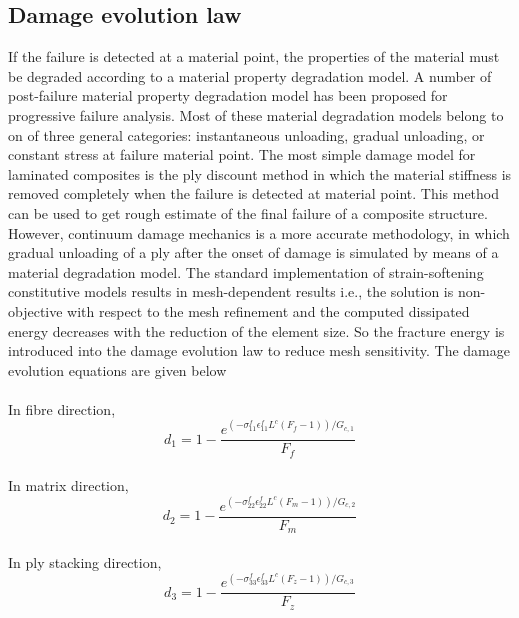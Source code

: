 \subsection{Damage evolution law}
\indent\indent\indent  If the failure is detected at a material point, the properties of the material must be degraded according to a material property degradation model. A number of post-failure material property degradation model has been proposed for progressive failure analysis. Most of these material degradation models belong to on of three general categories: instantaneous unloading, gradual unloading, or constant stress at failure material point. The most simple damage model for laminated composites is the ply discount method in which the material stiffness is removed completely when the failure is detected at material point. This method can be used to get rough estimate of the final failure of a composite structure. However, continuum damage mechanics is a more accurate methodology, in which gradual unloading of a ply after the onset of damage is simulated by means of a material degradation model. The standard implementation of strain-softening constitutive models results in mesh-dependent results i.e., the solution is non-objective with respect to the mesh refinement and the computed dissipated energy decreases with the reduction of the element size. So the fracture energy is introduced into the damage evolution law to reduce mesh sensitivity. The damage evolution equations are given below
\\
\\
In fibre direction,
\begin{equation}
d_{1} = 1 - \frac{e^{(-\sigma_{11}^{f}\epsilon_{11}^{f}L^{c}(F_{f} - 1))    /G_{c,1}}}{F_{f}}   
\end{equation}
\\
In matrix direction,
\begin{equation}
d_{2} = 1 - \frac{e^{(-\sigma_{22}^{f}\epsilon_{22}^{f}L^{c}(F_{m} - 1))    /G_{c,2}}}{F_{m}}   
\end{equation}
\\
In ply stacking direction,
\begin{equation}
d_{3} = 1 - \frac{e^{(-\sigma_{33}^{f}\epsilon_{33}^{f}L^{c}(F_{z} - 1))    /G_{c,3}}}{F_{z}}   
\end{equation}
\\